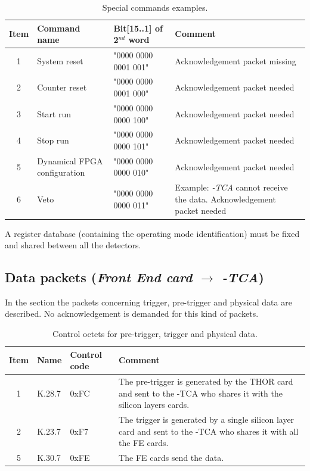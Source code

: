 \begin{table} [!htbp]
  \centering
  \caption{Special commands examples.}
\begin{tabular}{|c|p{4cm}|p{4cm}|p{4cm}|}
\hline
\bf{Item}  			& 	\bf{Command name}	& \bf{Bit[15..1] of 2$^{nd}$ word} & \bf{Comment} \\
\hline
	1				&	System reset				& "0000 0000 0001  001"  	& Acknowledgement packet missing \\
	2				&	Counter reset			& "0000 0000 0001  000"  	& Acknowledgement packet needed \\
	3				&	Start run					& "0000 0000 0000  100"  	& Acknowledgement packet needed\\
	4				&	Stop run					& "0000 0000 0000  101" 	& Acknowledgement packet needed\\
	5				&	Dynamical FPGA configuration		& "0000 0000 0000  010" 	& Acknowledgement packet needed\\
	6				&	Veto						& "0000 0000 0000  011" 	& Example: \textit{\charmu-TCA} cannot receive the data. Acknowledgement packet needed\\
\hline
\end{tabular}
\end{table}

A register database (containing the operating mode identification) must be fixed and shared between all the detectors.

\newpage
\subsection{Data packets (\textit{Front End card $\rightarrow$ {\charmu-TCA}})}

In the section the packets concerning trigger, pre-trigger and physical data are described.\newline
No acknowledgement is demanded for this kind of packets.

\begin{table} [!htbp]
  \centering
  \caption{Control octets for pre-trigger, trigger and physical data.}
\begin{tabular}{|c|p{4cm}|p{4cm}|p{4cm}|}
\hline
\bf{Item}  			& 	\bf{Name}	& \bf{Control code} & \bf{Comment} \\
\hline
	1				&	K.28.7	& 0xFC  	& The pre-trigger is generated by the THOR card and sent to the \charmu-TCA who shares it with the silicon layers cards. \\
	\hline
	2				&	K.23.7	& 0xF7  	& The trigger is generated by a single silicon layer card and sent to the \charmu-TCA who shares it with all the FE cards.\\
	\hline
	5				&	K.30.7	& 0xFE	& The FE cards send the data.  \\
\hline
\end{tabular}
\end{table}

